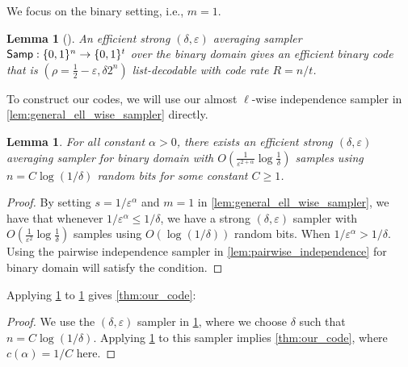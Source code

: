 \documentclass[11pt,letterpaper]{article}
\newtheorem{lemma}[theorem]{Lemma}
\newcommand{\eps}{\varepsilon}
\newcommand{\1}{\mathbbm{1}}
\newcommand{\zo}{\{0, 1\}}
\newcommand{\Smp}{\textup{\textsf{Samp}}}
\begin{document}
We focus on the binary setting, i.e., $m=1$.

\begin{lemma}[\cite{ExtractorCodes}]
    \label{lem:sampler_implies_codes}
    An efficient strong $(\delta, \eps)$ averaging sampler $\Smp : \zo^n \to \zo^t$ over the binary domain gives an efficient binary code that is $ (\rho = \frac{1}{2} - \eps, \delta 2^n)$ list-decodable with code rate $R = n / t$.
\end{lemma}

To construct our codes, we will use our almost $\ell$-wise independence sampler in \cref{lem:general_ell_wise_sampler} directly.
\begin{lemma}
    \label{lem:code_sampler}
    For all constant $\alpha > 0$,
     there exists an efficient strong $(\delta, \eps)$ averaging sampler for binary domain with $O(\frac{1}{\eps^{2 + \alpha}} \log \frac{1}{\delta})$ samples using $n = C\log(1 / \delta)$ random bits for some constant $C \ge 1$.
\end{lemma}
\begin{proof}
    By setting $s = 1 / \eps^\alpha$ and $m = 1$ in \cref{lem:general_ell_wise_sampler}, we have that whenever $1 / \eps^\alpha \le 1 / \delta$, we have a strong $(\delta, \eps)$ sampler with $O(\frac{1}{\eps^2} \log \frac{1}{\delta})$ samples using $O(\log(1 / \delta))$ random bits. When $1 / \eps^\alpha > 1 / \delta$. Using the pairwise independence sampler in \cref{lem:pairwise_independence} for binary domain will satisfy the condition.
\end{proof}


Applying \cref{lem:sampler_implies_codes} to \cref{lem:code_sampler}
gives \cref{thm:our_code}:
\OurCode*
\begin{proof}
    We use the $(\delta, \eps)$ sampler in \cref{lem:code_sampler}, where we choose $\delta$ such that $n = C\log(1 / \delta)$. 
    Applying \cref{lem:sampler_implies_codes} to this sampler implies \cref{thm:our_code}, where $c(\alpha) = 1 / C$ here.
\end{proof}

\label{sec:codes}
\end{document}
